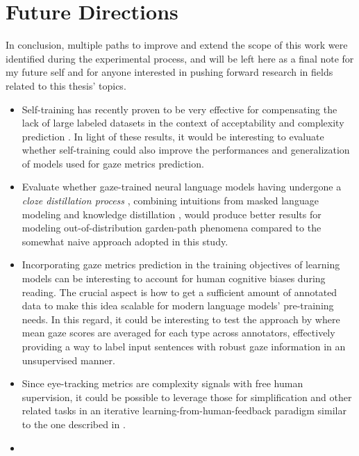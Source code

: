 \documentclass[a4paper, nobind]{templates/ociamthesis}
\begin{document}
\hypertarget{future-directions}{%
\section*{Future Directions}\label{future-directions}}

In conclusion, multiple paths to improve and extend the scope of this work were identified during the experimental process, and will be left here as a final note for my future self and for anyone interested in pushing forward research in fields related to this thesis' topics.

\begin{itemize}
\item
  Self-training has recently proven to be very effective for compensating the lack of large labeled datasets in the context of acceptability and complexity prediction \autocite{sarti-2020-umbertomtsa}. In light of these results, it would be interesting to evaluate whether self-training could also improve the performances and generalization of models used for gaze metrics prediction.
\item
  Evaluate whether gaze-trained neural language models having undergone a \emph{cloze distillation process} \autocite{eisape-etal-2020-cloze}, combining intuitions from masked language modeling and knowledge distillation \autocite{hinton-etal-2015-distilling}, would produce better results for modeling out-of-distribution garden-path phenomena compared to the somewhat naive approach adopted in this study.
\item
  Incorporating gaze metrics prediction in the training objectives of learning models can be interesting to account for human cognitive biases during reading. The crucial aspect is how to get a sufficient amount of annotated data to make this idea scalable for modern language models' pre-training needs. In this regard, it could be interesting to test the approach by \textcite{hollenstein-zhang-2019-entity} where mean gaze scores are averaged for each type across annotators, effectively providing a way to label input sentences with robust gaze information in an unsupervised manner.
\item
  Since eye-tracking metrics are complexity signals with free human supervision, it could be possible to leverage those for simplification and other related tasks in an iterative learning-from-human-feedback paradigm similar to the one described in \textcite{stiennon-etal-2020-learning}.
\item

\end{itemize}
\end{document}
